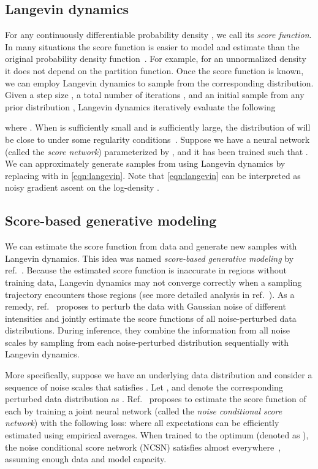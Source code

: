 \documentclass{article}
\begin{document}
\subsection{Langevin dynamics}
For any continuously differentiable probability density , we call  its \emph{score function}. In many situations the score function is easier to model and estimate than the original probability density function~\cite{hyvarinen2005estimation, song2019sliced}. For example, for an unnormalized density it does not depend on the partition function. Once the score function is known, we can employ Langevin dynamics to sample from the corresponding distribution. Given a step size , a total number of iterations , and an initial sample  from any prior distribution , Langevin dynamics iteratively evaluate the following

where . When  is sufficiently small and  is sufficiently large, the distribution of  will be close to  under some regularity conditions~\cite{roberts1996exponential,welling2011bayesian}. Suppose we have a neural network  (called the \emph{score network}) parameterized by , and it has been trained such that . We can approximately generate samples from  using Langevin dynamics by replacing  with  in \cref{eqn:langevin}.
Note that \cref{eqn:langevin} can be interpreted as noisy gradient ascent on the log-density .

\subsection{Score-based generative modeling}\label{sec:ald}
We can estimate the score function from data and generate new samples with Langevin dynamics. This idea was named \emph{score-based generative modeling} by ref.~\cite{song2019generative}. Because the estimated score function is inaccurate in regions without training data, Langevin dynamics may not converge correctly when a sampling trajectory encounters those regions (see more detailed analysis in ref.~\cite{song2019generative}). As a remedy, ref.~\cite{song2019generative} proposes to perturb the data with Gaussian noise of different intensities and jointly estimate the score functions of all noise-perturbed data distributions. During inference, they combine the information from all noise scales by sampling from each noise-perturbed distribution sequentially with Langevin dynamics.


More specifically, suppose we have an underlying data distribution  and consider a sequence of noise scales  that satisfies . Let , and denote the corresponding perturbed data distribution as . Ref.~\cite{song2019generative} proposes to estimate the score function of each  by training a joint neural network  (called the \emph{noise conditional score network}) with the following loss:
where all expectations can be efficiently estimated using empirical averages. When trained to the optimum (denoted as ), the noise conditional score network (NCSN) satisfies  almost everywhere~\cite{song2019generative}, assuming enough data and model capacity.
\end{document}
